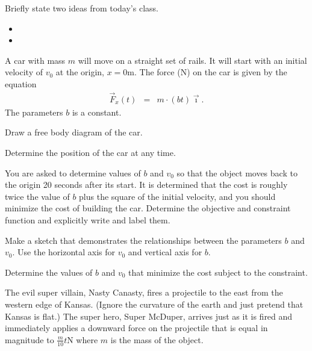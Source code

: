 \begin{problem}
\item Briefly state two ideas from today's class.
  \begin{itemize}
  \item
  \item
  \end{itemize}
\item A car with mass $m$ will move on a straight set of rails. It
  will start with an initial velocity of $v_0$ at the origin,
  $x=0$m. The force (N) on the car is given by the equation
  \begin{eqnarray*}
    \vec{F}_x(t) & = & m\cdot(bt) \vec{\imath}.
  \end{eqnarray*}
  The parameters $b$ is a constant.

  \begin{subproblem}
    \item Draw a free body diagram of the car.
      \vfill
    \item Determine the position of the car at any time.
      \vfill

      \clearpage

    \item You are asked to determine values of $b$ and $v_0$ so that
      the object moves back to the origin 20 seconds after its
      start. It is determined that the cost is roughly twice the value
      of $b$ plus the square of the initial velocity, and you should
      minimize the cost of building the car. Determine the objective
      and constraint function and explicitly write and label them.

      \vfill

    \item Make a sketch that demonstrates the relationships between
      the parameters $b$ and $v_0$. Use the horizontal axis for $v_0$
      and vertical axis for $b$.

      \vfill

      \clearpage

    \item Determine the values of $b$ and $v_0$ that minimize the cost
      subject to the constraint.

      \vfill

  \end{subproblem}

  \clearpage

\item The evil super villain, Nasty Canasty, fires a projectile to the
  east from the western edge of Kansas.  (Ignore the curvature of the
  earth and just pretend that Kansas is flat.)  The super hero, Super
  McDuper, arrives just as it is fired and immediately applies a
  downward force on the projectile that is equal in magnitude to
  $\frac{m}{10}t$N where $m$ is the mass of the object.


\end{problem}
